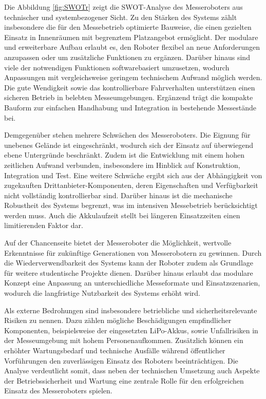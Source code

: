 Die Abbildung \ref{fig:SWOTr} zeigt die SWOT-Analyse des Messeroboters aus technischer und systembezogener Sicht. Zu den Stärken des Systems zählt insbesondere die für den Messebetrieb optimierte Bauweise, die einen gezielten Einsatz in Innenräumen mit begrenztem Platzangebot ermöglicht. Der modulare und erweiterbare Aufbau erlaubt es, den Roboter flexibel an neue Anforderungen anzupassen oder um zusätzliche Funktionen zu ergänzen. Darüber hinaus sind viele der notwendigen Funktionen softwarebasiert umzusetzen, wodurch Anpassungen mit vergleichsweise geringem technischem Aufwand möglich werden. Die gute Wendigkeit sowie das kontrollierbare Fahrverhalten unterstützen einen sicheren Betrieb in belebten Messeumgebungen. Ergänzend trägt die kompakte Bauform zur einfachen Handhabung und Integration in bestehende Messestände bei.

Demgegenüber stehen mehrere Schwächen des Messeroboters. Die Eignung für unebenes Gelände ist eingeschränkt, wodurch sich der Einsatz auf überwiegend ebene Untergründe beschränkt. Zudem ist die Entwicklung mit einem hohen zeitlichen Aufwand verbunden, insbesondere im Hinblick auf Konstruktion, Integration und Test. Eine weitere Schwäche ergibt sich aus der Abhängigkeit von zugekauften Drittanbieter-Komponenten, deren Eigenschaften und Verfügbarkeit nicht vollständig kontrollierbar sind. Darüber hinaus ist die mechanische Robustheit des Systems begrenzt, was im intensiven Messebetrieb berücksichtigt werden muss. Auch die Akkulaufzeit stellt bei längeren Einsatzzeiten einen limitierenden Faktor dar.

Auf der Chancenseite bietet der Messeroboter die Möglichkeit, wertvolle Erkenntnisse für zukünftige Generationen von Messerobotern zu gewinnen. Durch die Wiederverwendbarkeit des Systems kann der Roboter zudem als Grundlage für weitere studentische Projekte dienen. Darüber hinaus erlaubt das modulare Konzept eine Anpassung an unterschiedliche Messeformate und Einsatzszenarien, wodurch die langfristige Nutzbarkeit des Systems erhöht wird.

Als externe Bedrohungen sind insbesondere betriebliche und sicherheitsrelevante Risiken zu nennen. Dazu zählen mögliche Beschädigungen empfindlicher Komponenten, beispielsweise der eingesetzten LiPo-Akkus, sowie Unfallrisiken in der Messeumgebung mit hohem Personenaufkommen. Zusätzlich können ein erhöhter Wartungsbedarf und technische Ausfälle während öffentlicher Vorführungen den zuverlässigen Einsatz des Roboters beeinträchtigen. Die Analyse verdeutlicht somit, dass neben der technischen Umsetzung auch Aspekte der Betriebssicherheit und Wartung eine zentrale Rolle für den erfolgreichen Einsatz des Messeroboters spielen.



